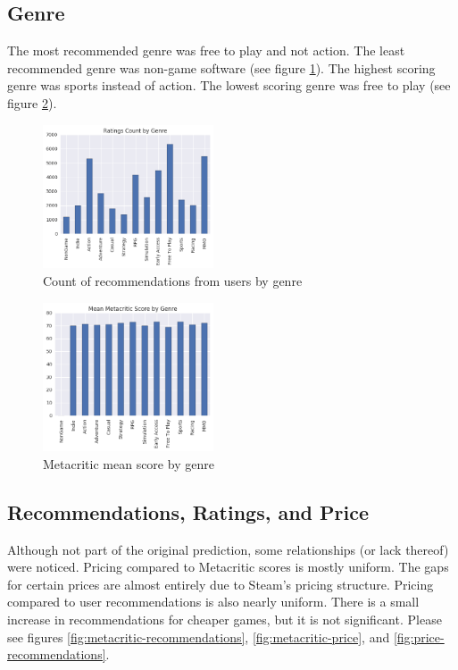 \documentclass[letterpaper,10pt,twocolumn]{article}
\begin{document}
\subsection{Genre}

The most recommended genre was free to play and not action. The least
recommended genre was non-game software (see figure \ref{fig:genre-ratings}).
The highest scoring genre was sports instead of action. The lowest
scoring genre was free to play (see figure \ref{fig:genre-metacritic}).

\begin{figure}[H]
    \label{fig:genre-ratings}
    \caption{Count of recommendations from users by genre}
    \includegraphics[width=0.45\textwidth,keepaspectratio]{genre-ratings-bar}
\end{figure}

\begin{figure}[H]
    \label{fig:genre-metacritic}
    \caption{Metacritic mean score by genre}
    \includegraphics[width=0.45\textwidth,keepaspectratio]{genre-metacritic-bar}
\end{figure}

\subsection{Recommendations, Ratings, and Price}

Although not part of the original prediction, some relationships (or lack
thereof) were noticed. Pricing compared to Metacritic scores is mostly
uniform. The gaps for certain prices are almost entirely due to Steam's
pricing structure. Pricing compared to user recommendations is also nearly
uniform. There is a small increase in recommendations for cheaper games, but
it is not significant. Please see figures
\ref{fig:metacritic-recommendations},
\ref{fig:metacritic-price}, and
\ref{fig:price-recommendations}.
\end{document}
